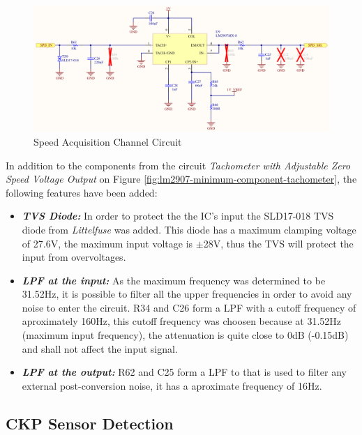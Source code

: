 			\begin{figure}[htbp]
				\centering
					\includegraphics[scale=0.6]{figuras/fig-ckp-conditioning-circuit.png}
				\caption{Speed Acquisition Channel Circuit \cite{ckp-conditioning-circuit}}
				\label{fig:ckp-conditioning-circuit}
			\end{figure}

			In addition to the components from the circuit \textit{Tachometer with Adjustable Zero Speed Voltage Output} on Figure \ref{fig:lm2907-minimum-component-tachometer}, the following features have been added:

			\begin{itemize}
				\item\textit{\textbf{TVS Diode:}} In order to protect the the IC's input the SLD17-018 TVS diode from \textit{Littelfuse} was added. This diode has a maximum clamping voltage of 27.6V, the maximum input voltage is $\pm$28V, thus the TVS will protect the input from overvoltages.\label{itm:ckp-circuit-tvs}
				\item\textit{\textbf{LPF at the input:}} As the maximum frequency was determined to be 31.52Hz, it is possible to filter all the upper frequencies in order to avoid any noise to enter the circuit. R34 and C26 form a LPF with a cutoff frequency of aproximately 160Hz, this cutoff frequency was choosen because at 31.52Hz (maximum input frequency), the attenuation is quite close to 0dB (-0.15dB) and shall not affect the input signal.\label{itm:ckp-circuit-lpf-input}
				\item\textit{\textbf{LPF at the output:}} R62 and C25 form a LPF to that is used to filter any external post-conversion noise, it has a aproximate frequency of 16Hz.\label{itm:ckp-circuit-lpf-output} 
			\end{itemize}


	\subsection{CKP Sensor Detection}\label{ssec:ckp-sensor-detection-circuit}

